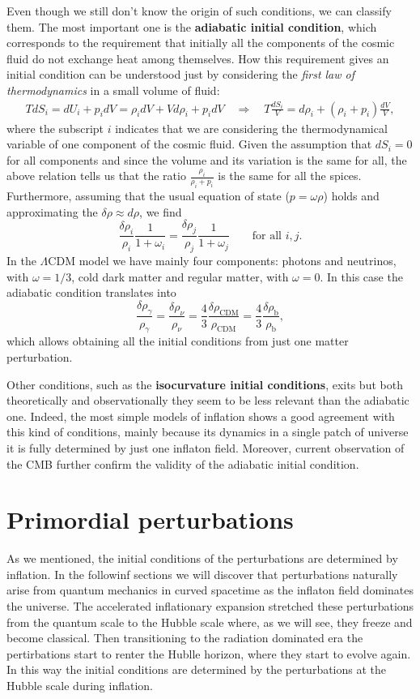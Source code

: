 Even though we still don't know the origin of such conditions, we can classify them. The most important one is the \textbf{adiabatic initial condition}, which corresponds to the requirement that initially all the components of the cosmic fluid do not exchange heat among themselves. How this requirement gives an initial condition can be understood just by considering the \emph{first law of thermodynamics} in a small volume of fluid:
\begin{align*}
    TdS_i=dU_i+p_idV=\rho_idV+Vd\rho_i+p_idV \quad\Rightarrow\quad T\frac{dS_i}{V}=d\rho_i+(\rho_i+p_i) \frac{dV}{V},
\end{align*}
where the subscript $i$ indicates that we are considering the thermodynamical variable of one component of the cosmic fluid. Given the assumption that $dS_i=0$ for all components and since the volume and its variation is the same for all, the above relation tells us that the ratio $\frac{\rho_i}{\rho_i+p_i}$ is the same for all the spices. Furthermore, assuming that the usual equation of state ($p=\omega\rho$) holds and approximating the $\delta\rho\approx d\rho$, we find
$$\frac{\delta \rho_i}{\rho_i}\frac{1}{1+\omega_i}=\frac{\delta \rho_j}{\rho_j}\frac{1}{1+\omega_j}\qquad\text{for all } i,j.$$
In the $\Lambda$CDM model we have mainly four components: photons and neutrinos, with $\omega=1/3$, cold dark matter and regular matter, with $\omega=0$. In this case the adiabatic condition translates into
\begin{equation}
    \frac{\delta \rho_\gamma}{\rho_\gamma}=\frac{\delta \rho_\nu}{\rho_\nu}=\frac{4}{3}\frac{\delta \rho_\text{CDM}}{\rho_\text{CDM}}=\frac{4}{3}\frac{\delta \rho_\text{b}}{\rho_\text{b}},
\end{equation}
which allows obtaining all the initial conditions from just one matter perturbation.

Other conditions, such as the \textbf{isocurvature initial conditions}, exits but both theoretically and observationally they seem to be less relevant than the adiabatic one. Indeed, the most simple models of inflation shows a good agreement with this kind of conditions, mainly because its dynamics in a single patch of universe it is fully determined by just one inflaton field. Moreover, current observation of the CMB further confirm the validity of the adiabatic initial condition.  

\section{Primordial perturbations}
As we mentioned, the initial conditions of the perturbations are determined by inflation. In the followinf sections we will discover that perturbations naturally arise from quantum mechanics in curved spacetime as the inflaton field dominates the universe. The accelerated inflationary expansion stretched these perturbations from the quantum scale to the Hubble scale where, as we will see, they freeze and become classical. Then transitioning to the radiation dominated era the pertirbations start to renter the Hublle horizon, where they start to evolve again. In this way the initial conditions are determined by the perturbations at the Hubble scale during inflation. 

